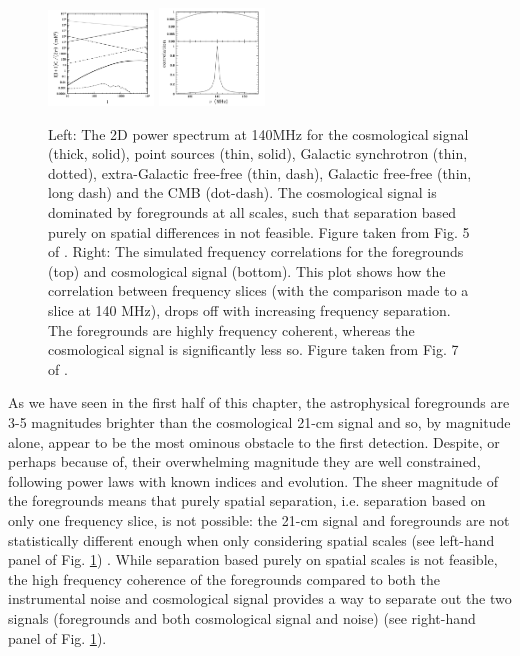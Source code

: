 \begin{figure}
\begin{center}
    \includegraphics[width=0.25\textwidth]{Images/santos_spat.png}
    \includegraphics[width=0.25\textwidth]{Images/santos_freq.png}
\end{center}
    \caption{Left: The 2D power spectrum at 140MHz for the cosmological signal (thick, solid), point sources (thin, solid), Galactic synchrotron (thin, dotted), extra-Galactic free-free (thin, dash), Galactic free-free (thin, long dash) and the CMB (dot-dash). The cosmological signal is dominated by foregrounds at all scales, such that separation based purely on spatial differences in not feasible. Figure taken from Fig. 5 of \citet{Santos2005ApJ...625..575S}. Right: The simulated frequency correlations for the foregrounds (top) and cosmological signal (bottom). This plot shows how the correlation between frequency slices (with the comparison made to a slice at 140 MHz), drops off with increasing frequency separation. The foregrounds are highly frequency coherent, whereas the cosmological signal is significantly less so. Figure taken from Fig. 7 of \citet{Santos2005ApJ...625..575S}.}
    \label{fig:santos_spatial}
\end{figure}

As we have seen in the first half of this chapter, the astrophysical foregrounds are 3-5 magnitudes brighter than the cosmological 21-cm signal and so, by magnitude alone, appear to be the most ominous obstacle to the first detection. Despite, or perhaps because of, their overwhelming magnitude they are well constrained, following power laws with known indices and evolution. The sheer magnitude of the foregrounds means that purely spatial separation, i.e. separation based on only one frequency slice, is not possible: the 21-cm signal and foregrounds are not statistically different enough when only considering spatial scales (see left-hand panel of Fig. \ref{fig:santos_spatial}) \citep{Santos2005ApJ...625..575S,DiMatteo2004MNRAS.355.1053D,Oh2003MNRAS.346..871O,DiMatteo2002ApJ...564..576D}. While separation based purely on spatial scales is not feasible, the high frequency coherence of the foregrounds compared to both the instrumental noise and cosmological signal provides a way to separate out the two signals (foregrounds and both cosmological signal and noise) (see right-hand panel of Fig. \ref{fig:santos_spatial}). 

